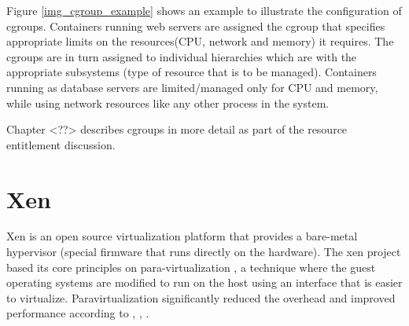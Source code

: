 Figure \ref{img_cgroup_example} shows an example to illustrate the configuration of cgroups. Containers running web servers are assigned the cgroup that specifies appropriate limits on the resources(CPU, network and memory) it requires. The cgroups are in turn assigned to individual hierarchies which are  with the appropriate subsystems (type of resource that is to be managed). Containers running as database servers are limited/managed only for CPU and memory, while using network resources like any other process in the system.


Chapter <??> describes cgroups in more detail as part of the resource entitlement discussion.  








\section{Xen}


Xen \cite{xen_overview}is an open source virtualization platform that provides a bare-metal hypervisor (special firmware that runs directly on the hardware). The xen project based its core principles on para-virtualization \cite{paravirt}  \cite{paravirt1}, a technique where the guest operating systems are modified to run on the host using an interface that is easier to virtualize. Paravirtualization significantly reduced the overhead and improved performance according to \cite{paravirt}, \cite{art_of_virt}, \cite{xen_perf}.

